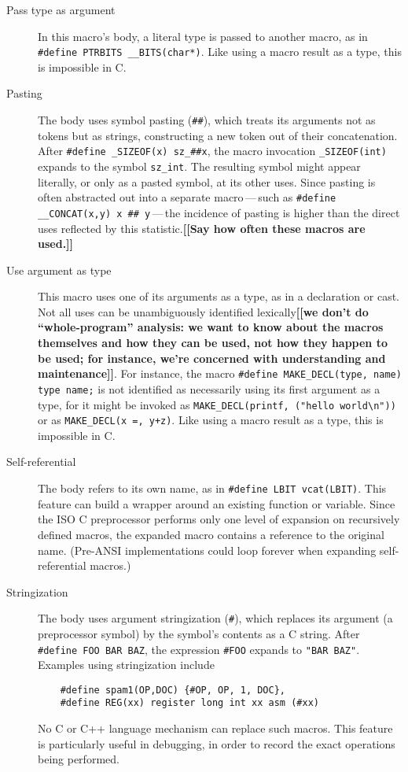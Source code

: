 \documentclass[10pt]{article}
\newcommand{\comment}[1]{\textbf{[[#1]]}}
\begin{document}
\begin{description}
\item[Pass type as argument]
  In this macro's body, a literal type is passed to another macro, as in
  {\tt \#define PTRBITS \verb|__BITS|(char*)}.  Like using a macro result
  as a type, this is impossible in C\@.

\item[Pasting]\label{def:pasting}
  The body uses symbol pasting ({\tt \#\#}), which treats its arguments not
  as tokens but as strings, constructing a new token out of their
  concatenation.  After {\tt \#define \verb|_SIZEOF|(x) \verb|sz_|\#\#x},
  the macro invocation {\tt \verb|_SIZEOF|(int)} expands to the 
  symbol {\tt \verb|sz_int|}.  The resulting symbol might appear literally, or
  only as a pasted symbol, at its other uses.  Since pasting is often
  abstracted out into a separate macro\,---\,such as {\tt \#define
  \verb|__CONCAT|(x,y) x \#\# y}\,---\,the incidence of pasting is higher
  than the direct uses reflected by this statistic.\comment{Say how often
  these macros are used.}

\item[Use argument as type]
  This macro uses one of its arguments as a type, as in a declaration or
  cast.  Not all uses can be unambiguously identified lexically\comment{we
  don't do ``whole-program'' analysis:  we want to know about the macros
  themselves and how they can be used, not how they happen to be used; for
  instance, we're concerned with understanding and maintenance}.  For
  instance, the macro {\tt \#define \verb|MAKE_DECL|(type, name) type
  name;} is not identified as necessarily using its first argument as a
type, for it might be invoked as {\tt \verb|MAKE_DECL|(printf, ("hello
world\verb|\|n"))} or as {\tt \verb|MAKE_DECL|(x =, y+z)}.  Like using a
macro result as a type, this is impossible in C\@.

\item[Self-referential]
  The body refers to its own name, as in {\tt \#define LBIT vcat(LBIT)}.
  This feature can build a wrapper around an existing function or variable.
  Since the ISO C preprocessor performs only one level of expansion on
  recursively defined macros, the expanded macro contains a reference to
  the original name.  (Pre-ANSI implementations could loop forever when
  expanding self-referential macros.)

\item[Stringization]
  The body uses argument stringization ({\tt \#}), which replaces its
  argument (a preprocessor symbol) by the symbol's contents as a C string.
  After {\tt \#define FOO BAR BAZ}, the expression {\tt \#FOO} expands to
  {\tt "BAR~BAZ"}.  Examples using stringization include
\begin{verbatim}
    #define spam1(OP,DOC) {#OP, OP, 1, DOC},
    #define REG(xx) register long int xx asm (#xx)
\end{verbatim}
  No C or C++ language mechanism can replace such macros.  This feature is
  particularly useful in debugging, in order to record the exact
  operations being performed.

\end{description}
\end{document}
